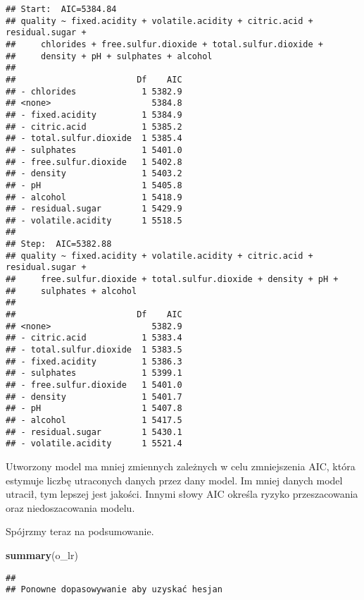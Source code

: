 \documentclass[
]{article}
\newenvironment{Shaded}{\begin{snugshade}}{\end{snugshade}}
\newcommand{\FunctionTok}[1]{\textcolor[rgb]{0.13,0.29,0.53}{\textbf{#1}}}
\newcommand{\NormalTok}[1]{#1}
\begin{document}
\begin{verbatim}
## Start:  AIC=5384.84
## quality ~ fixed.acidity + volatile.acidity + citric.acid + residual.sugar + 
##     chlorides + free.sulfur.dioxide + total.sulfur.dioxide + 
##     density + pH + sulphates + alcohol
## 
##                        Df    AIC
## - chlorides             1 5382.9
## <none>                    5384.8
## - fixed.acidity         1 5384.9
## - citric.acid           1 5385.2
## - total.sulfur.dioxide  1 5385.4
## - sulphates             1 5401.0
## - free.sulfur.dioxide   1 5402.8
## - density               1 5403.2
## - pH                    1 5405.8
## - alcohol               1 5418.9
## - residual.sugar        1 5429.9
## - volatile.acidity      1 5518.5
## 
## Step:  AIC=5382.88
## quality ~ fixed.acidity + volatile.acidity + citric.acid + residual.sugar + 
##     free.sulfur.dioxide + total.sulfur.dioxide + density + pH + 
##     sulphates + alcohol
## 
##                        Df    AIC
## <none>                    5382.9
## - citric.acid           1 5383.4
## - total.sulfur.dioxide  1 5383.5
## - fixed.acidity         1 5386.3
## - sulphates             1 5399.1
## - free.sulfur.dioxide   1 5401.0
## - density               1 5401.7
## - pH                    1 5407.8
## - alcohol               1 5417.5
## - residual.sugar        1 5430.1
## - volatile.acidity      1 5521.4
\end{verbatim}

Utworzony model ma mniej zmiennych zależnych w celu zmniejszenia AIC,
która estymuje liczbę utraconych danych przez dany model. Im mniej
danych model utracił, tym lepszej jest jakości. Innymi słowy AIC określa
ryzyko przeszacowania oraz niedoszacowania modelu.

Spójrzmy teraz na podsumowanie.

\begin{Shaded}
\begin{Highlighting}[]
\FunctionTok{summary}\NormalTok{(o\_lr)}
\end{Highlighting}
\end{Shaded}

\begin{verbatim}
## 
## Ponowne dopasowywanie aby uzyskać hesjan
\end{verbatim}
\end{document}
